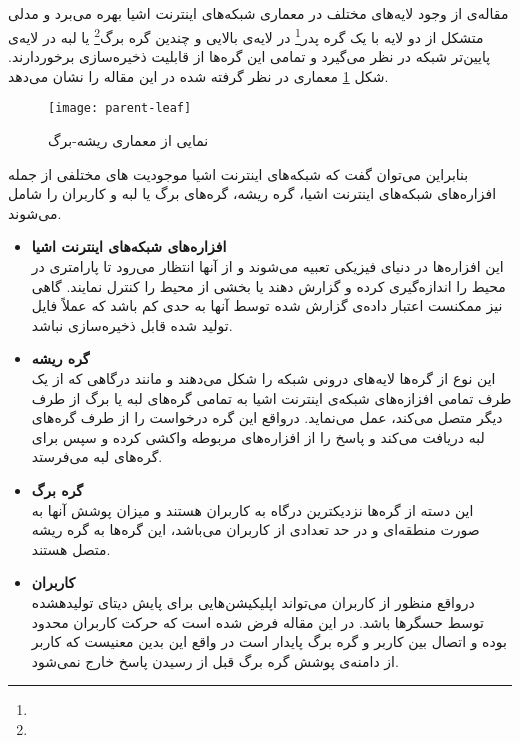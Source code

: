 

\subsection{}

مقاله‌ی \cite{wu2022deep} از وجود لایه‌های مختلف در معماری شبکه‌های اینترنت اشیا بهره می‌برد و مدلی متشکل از دو لایه با یک گره پدر\footnote{} در لایه‌ی بالایی و چندین گره برگ\footnote{} یا لبه در لایه‌ی پایین‌تر شبکه در نظر می‌گیرد و تمامی این گره‌ها از قابلیت ذخیره‌سازی برخوردارند. شکل \ref{fig:parent-leaf} معماری در نظر گرفته شده در این مقاله را نشان می‌دهد.

\begin{figure}[ht]
	\centerline{\texttt{[image: parent-leaf]}}
	\caption{نمایی از معماری ریشه-برگ}
	\label{fig:parent-leaf}
\end{figure}

بنابراین می‌توان گفت که شبکه‌های اینترنت اشیا موجودیت های مختلفی از جمله افزاره‌های شبکه‌های اینترنت اشیا، گره ریشه، گره‌های برگ یا لبه و کاربران را شامل می‌شوند. 
\begin{itemize}
	\item \textbf{افزاره‌های شبکه‌های اینترنت اشیا}\\
	این افزاره‌ها در دنیای فیزیکی تعبیه می‌شوند و از آنها انتظار می‌رود تا پارامتری در محیط را اندازه‌گیری کرده و گزارش دهند یا بخشی از محیط را کنترل نمایند. گاهی نیز ممکنست اعتبار داده‌ی گزارش شده توسط آنها به حدی کم باشد که عملاً فایل تولید شده قابل ذخیره‌سازی نباشد.
	\item \textbf{گره ریشه}\\
	این نوع از گره‌ها لایه‌های درونی شبکه را شکل می‌دهند و مانند درگاهی که از یک طرف تمامی افزازه‌های شبکه‌ی اینترنت اشیا به تمامی گره‌های لبه یا برگ از طرف دیگر متصل می‌کند، عمل می‌نماید. درواقع این گره درخواست را از طرف گره‌های لبه دریافت می‌کند و پاسخ را از افزاره‌های مربوطه واکشی کرده و سپس برای گره‌های لبه می‌فرستد.
	\item \textbf{گره برگ}\\
	این دسته از گره‌ها نزدیکترین درگاه به کاربران هستند و میزان پوشش آنها به صورت منطقه‌ای و در حد تعدادی از کاربران می‌باشد، این گره‌ها به گره ریشه متصل هستند. 
	\item \textbf{کاربران}\\
	درواقع منظور از کاربران می‌تواند اپلیکیشن‌هایی برای پایش دیتای تولیدهشده توسط حسگرها باشد. در این مقاله فرض شده است که حرکت کاربران محدود بوده و اتصال بین کاربر و گره برگ پایدار است در واقع این بدین معنیست که کاربر از دامنه‌ی پوشش گره برگ قبل از رسیدن پاسخ خارج نمی‌شود. 
\end{itemize}

